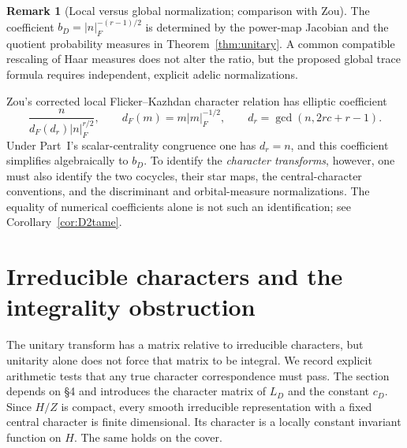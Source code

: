 \documentclass[11pt]{article}
\theoremstyle{plain}
\theoremstyle{definition}
\newtheorem{remark}[theorem]{Remark}
\begin{document}
\begin{remark}[Local versus global normalization; comparison with Zou]\label{rem:normalizations}
The coefficient $b_D=|n|_F^{-(r-1)/2}$ is determined by the
power-map Jacobian and the quotient probability measures in
Theorem~\ref{thm:unitary}. A common compatible rescaling of Haar
measures does not alter the ratio, but the proposed global trace
formula requires independent, explicit adelic normalizations.

Zou's corrected local Flicker--Kazhdan character relation
\cite[(3.2) and Remark~3.3]{Zou} has elliptic coefficient
\[
  \frac{n}{d_F(d_r)|n|_F^{r/2}},\qquad
  d_F(m)=m|m|_F^{-1/2},\qquad
  d_r=\gcd(n,2rc+r-1).
\]
Under Part~I's scalar-centrality congruence one has $d_r=n$, and
this coefficient simplifies algebraically to $b_D$.
To identify the \emph{character transforms}, however, one must also
identify the two cocycles, their star maps, the central-character
conventions, and the discriminant and orbital-measure normalizations.
The equality of numerical coefficients alone is not such an
identification; see Corollary~\ref{cor:D2tame}.
\end{remark}

\section{Irreducible characters and the integrality obstruction}\label{sec:characters}
The unitary transform has a matrix relative to irreducible characters,
but unitarity alone does not force that matrix to be integral.
We record explicit arithmetic tests that any true character
correspondence must pass. The section depends on \S4 and introduces the character matrix of $L_D$ and the constant $c_D$.
Since $H/Z$ is compact, every smooth irreducible representation with a fixed central character is finite dimensional. Its character is a locally constant invariant function on $H$. The same holds on the cover.
\end{document}
